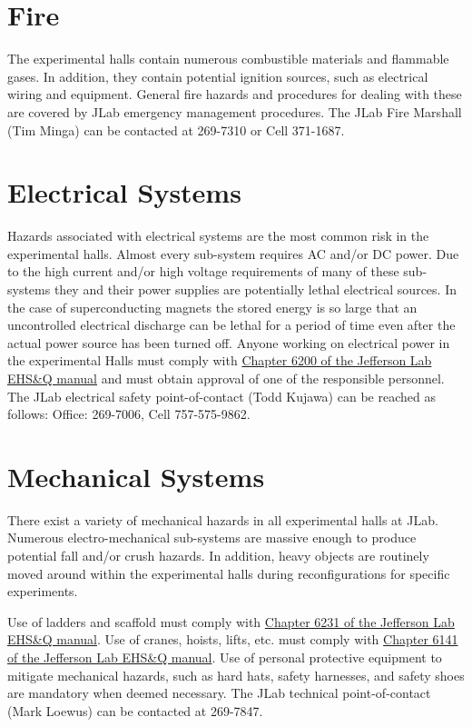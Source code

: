 \section{Fire}

	The experimental halls contain numerous combustible materials and flammable gases. 
In addition, they contain potential ignition sources, such as electrical wiring and equipment. 
General fire hazards and procedures for dealing with these are covered by JLab emergency 
management procedures. The JLab Fire Marshall (Tim Minga) can be contacted at 269-7310 or
Cell 371-1687.

\section{Electrical Systems}

	Hazards associated with electrical systems are the most common risk in the experimental halls. 
Almost every sub-system requires AC and/or DC power. Due to the high current and/or high voltage 
requirements of many of these sub-systems they and their power supplies are potentially lethal 
electrical sources. In the case of superconducting magnets the stored energy is so large that 
an uncontrolled electrical discharge can be lethal for a period of time even after the actual 
power source has been turned off.  Anyone working on electrical power in the experimental Halls 
must comply with \href{http://www.jlab.org/ehs/ehsmanual/manual/6200.html}{Chapter 6200 of the Jefferson Lab EHS\&Q manual}
and must obtain approval of one of the responsible personnel. 
The JLab electrical safety point-of-contact (Todd Kujawa) can be reached as follows: Office: 269-7006,
Cell 757-575-9862.

\section{Mechanical Systems}

	There exist a variety of mechanical hazards in all experimental halls at JLab. 
Numerous electro-mechanical sub-systems are massive enough to produce potential fall 
and/or crush hazards.  In addition, heavy objects are routinely moved around within 
the experimental halls during reconfigurations for specific experiments. 

Use of ladders and scaffold must comply 
with \href{http://www.jlab.org/ehs/ehsmanual/manual/6132.html}{Chapter 6231 of the 
Jefferson Lab EHS\&Q manual}.
Use of cranes, hoists, lifts, etc. must comply with
\href{http://www.jlab.org/ehs/ehsmanual/manual/6141.html}{Chapter 6141 of the 
Jefferson Lab EHS\&Q manual}. 
Use of personal protective equipment 
to mitigate mechanical hazards, such as hard hats, safety harnesses, and safety 
shoes are mandatory when deemed necessary.
The JLab technical point-of-contact (Mark Loewus) can be contacted at 269-7847.


